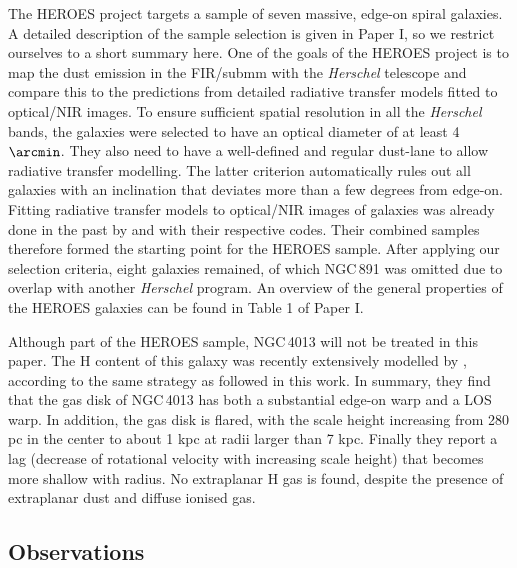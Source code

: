\documentclass{aa}
\begin{document}
The HEROES project targets a sample of seven massive, edge-on spiral galaxies. A detailed description of the sample selection is given in Paper I, so we restrict ourselves to a short summary here. One of the goals of the HEROES project is to map the dust emission in the FIR/submm with the \textit{Herschel} telescope and compare this to the predictions from detailed radiative transfer models fitted to optical/NIR images. To ensure sufficient spatial resolution in all the \textit{Herschel} bands, the galaxies were selected to have an optical diameter of at least 4$\arcmin$. They also need to have a well-defined and regular dust-lane to allow radiative transfer modelling. The latter criterion automatically rules out all galaxies with an inclination that deviates more than a few degrees from edge-on. Fitting radiative transfer models to optical/NIR images of galaxies was already done in the past by \cite{xilouris97, xilouris99} and \cite{bianchi07} with their respective codes. Their combined samples therefore formed the starting point for the HEROES sample. After applying our selection criteria, eight galaxies remained, of which NGC\,891 was omitted due to overlap with another \textit{Herschel} program. An overview of the general properties of the HEROES galaxies can be found in Table 1 of Paper I.
\par
Although part of the HEROES sample, NGC\,4013 will not be treated in this paper. The H{} content of this galaxy was recently extensively modelled by \cite{zschaechner15}, according to the same strategy as followed in this work. In summary, they find that the gas disk of NGC\,4013 has both a substantial edge-on warp and a LOS warp. In addition, the gas disk is flared, with the scale height increasing from 280 pc in the center to about 1 kpc at radii larger than 7 kpc. Finally they report a lag (decrease of rotational velocity with increasing scale height) that becomes more shallow with radius. No extraplanar H{} gas is found, despite the presence of extraplanar dust and diffuse ionised gas.


\subsection{Observations}
\end{document}
